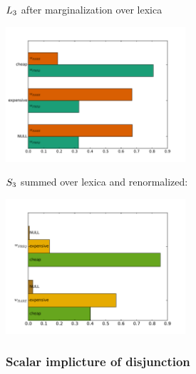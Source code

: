 \documentclass{article}
\begin{document}
\begin{examples}
\item $\ListenerK[3]$ after marginalization over lexica

\includegraphics[width=0.5\textwidth]{fig/manner-expertise-listener-marginalized}

\item $\SpeakerK[3]$ summed over lexica and renormalized:

  \includegraphics[width=0.5\textwidth]{fig/manner-expertise-speaker-lexsum}
\end{examples}




\subsubsection{Scalar implicture of disjunction}\label{sec:scalar-disj}
\end{document}
